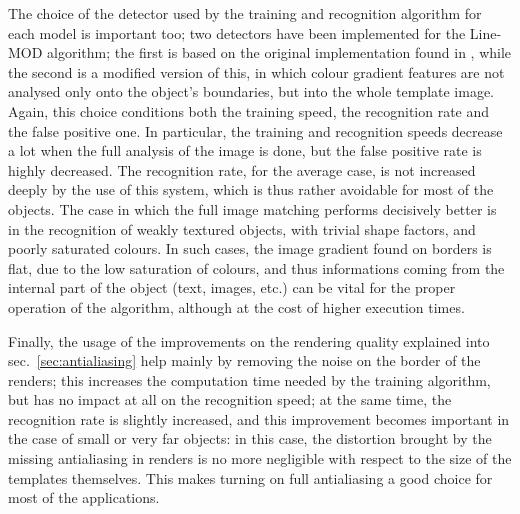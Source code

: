 The choice of the detector used by the training and recognition
algorithm for each model is important too; two detectors have been
implemented for the Line-MOD algorithm; the first is based on the
original implementation found in \cite{linemod-paper}, while the
second is a modified version of this, in which colour gradient
features are not analysed only onto the object's boundaries, but into
the whole template image. Again, this choice conditions both the
training speed, the recognition rate and the false positive one. In
particular, the training and recognition speeds decrease a lot when
the full analysis of the image is done, but the false positive rate is
highly decreased. The recognition rate, for the average case, is not
increased deeply by the use of this system, which is thus rather
avoidable for most of the objects. The case in which the full image
matching performs decisively better is in the recognition of weakly
textured objects, with trivial shape factors, and poorly saturated
colours. In such cases, the image gradient found on borders is flat,
due to the low saturation of colours, and thus informations coming
from the internal part of the object (text, images, etc.) can be vital
for the proper operation of the algorithm, although at the cost of
higher execution times.

Finally, the usage of the improvements on the rendering quality
explained into sec.~\ref{sec:antialiasing} help mainly by removing the noise on
the border of the renders; this increases the computation time
needed by the training algorithm, but has no impact at all on the
recognition speed; at the same time, the recognition rate is slightly
increased, and this improvement becomes important in the case of small
or very far objects: in this case, the distortion brought by the
missing antialiasing in renders is no more negligible with respect to
the size of the templates themselves. This makes turning on full
antialiasing a good choice for most of the applications.

